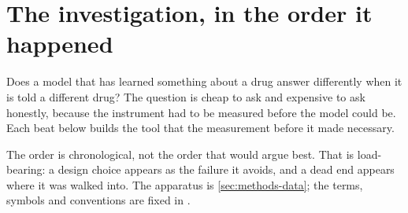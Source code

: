 %
%
%
%
\chapter{The investigation, in the order it happened}
\label{sec:methods}
\label{sec:results}

\begin{question}
Does a model that has learned something about a drug answer differently when it
is told a different drug? The question is cheap to ask and expensive to ask
honestly, because the instrument had to be measured before the model could be.
Each beat below builds the tool that the measurement before it made necessary.
\end{question}

\noindent
The order is chronological, not the order that would argue best. That is
load-bearing: a design choice appears as the failure it avoids, and a dead end
appears where it was walked into. The apparatus is \cref{sec:methods-data}; the
terms, symbols and conventions are fixed in .

